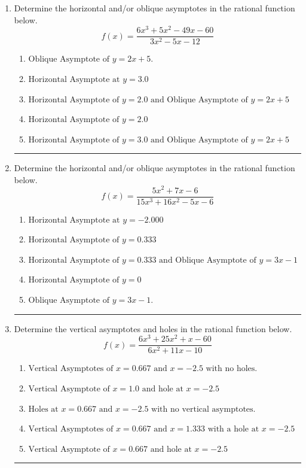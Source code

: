 \documentclass[14pt]{extbook}
\newcommand{\litem}[1]{\item#1\hspace*{-1cm}\rule{\textwidth}{0.4pt}}
\begin{document}
\begin{enumerate}
{\begin{enumerate}[label=\Alph*.]
\end{enumerate} }
\litem{
Determine the horizontal and/or oblique asymptotes in the rational function below.\[ f(x) = \frac{6x^{3} +5 x^{2} -49 x -60}{3x^{2} -5 x -12} \]\begin{enumerate}[label=\Alph*.]
\item \( \text{Oblique Asymptote of } y = 2x + 5. \)
\item \( \text{Horizontal Asymptote at } y = 3.0 \)
\item \( \text{Horizontal Asymptote of } y = 2.0 \text{ and Oblique Asymptote of } y = 2x + 5 \)
\item \( \text{Horizontal Asymptote of } y = 2.0  \)
\item \( \text{Horizontal Asymptote of } y = 3.0 \text{ and Oblique Asymptote of } y = 2x + 5 \)

\end{enumerate} }
\litem{
Determine the horizontal and/or oblique asymptotes in the rational function below.\[ f(x) = \frac{5x^{2} +7 x -6}{15x^{3} +16 x^{2} -5 x -6} \]\begin{enumerate}[label=\Alph*.]
\item \( \text{Horizontal Asymptote at } y = -2.000 \)
\item \( \text{Horizontal Asymptote of } y = 0.333  \)
\item \( \text{Horizontal Asymptote of } y = 0.333 \text{ and Oblique Asymptote of } y = 3x -1 \)
\item \( \text{Horizontal Asymptote of } y = 0 \)
\item \( \text{Oblique Asymptote of } y = 3x -1. \)

\end{enumerate} }
\litem{
Determine the vertical asymptotes and holes in the rational function below.\[ f(x) = \frac{6x^{3} +25 x^{2} +x -60}{6x^{2} +11 x -10} \]\begin{enumerate}[label=\Alph*.]
\item \( \text{Vertical Asymptotes of } x = 0.667 \text{ and } x = -2.5 \text{ with no holes.} \)
\item \( \text{Vertical Asymptote of } x = 1.0 \text{ and hole at } x = -2.5 \)
\item \( \text{Holes at } x = 0.667 \text{ and } x = -2.5 \text{ with no vertical asymptotes.} \)
\item \( \text{Vertical Asymptotes of } x = 0.667 \text{ and } x = 1.333 \text{ with a hole at } x = -2.5 \)
\item \( \text{Vertical Asymptote of } x = 0.667 \text{ and hole at } x = -2.5 \)


\end{enumerate}}
\end{enumerate}
\end{document}
